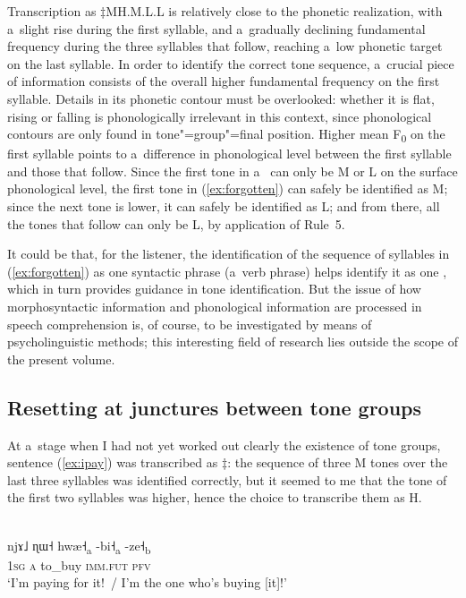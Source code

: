 Transcription as $\ddagger${\kern2pt}MH.M.L.L is relatively close to the
phonetic realization, with a~slight rise during the first syllable, and a~gradually declining
fundamental frequency during the three syllables that follow, reaching a~low phonetic target on
the last syllable. In order to identify the correct tone sequence, a~crucial piece of information
consists of the overall higher fundamental frequency on the first syllable. Details in its phonetic
{contour} must be overlooked: whether it is flat, rising or falling is phonologically irrelevant in
this context, since phonological contours are only found in tone"=group"=final position. Higher mean F\textsubscript{0} on the first syllable points to a~difference in phonological level between the first syllable and those that
follow. Since the first tone in a~ can only be M or L on the surface phonological level,
the first tone in (\ref{ex:forgotten}) can safely be identified as M; since the next tone is lower, it can safely be identified as L; and from there, all the tones that follow can only be L, by application of Rule~5. 

It could be that, for the listener, the identification of the sequence of syllables in (\ref{ex:forgotten}) as one syntactic phrase (a~verb phrase) helps identify it as one , which in turn provides guidance in tone identification. But the issue of how morphosyntactic information and phonological information are processed in speech comprehension is, of course, to be investigated by means of psycholinguistic methods; this interesting field of research lies outside the scope of the present volume.


\subsection{Resetting at junctures between tone groups}
\label{sec:resettingatjuncturesbetweentonegroups}

At a~stage when I had not yet worked out clearly the existence of tone groups, sentence (\ref{ex:ipay}) was
transcribed as $\ddagger${\kern2pt}: the sequence of three M tones over the last three
syllables was identified correctly, but it seemed to me that the tone of the first two syllables was higher, hence the choice to transcribe them as H. 

\begin{exe}
	\ex
	\label{ex:ipay}
	\\ 
	\gll njɤ˩	ɳɯ˧	hwæ˧\textsubscript{a}	-bi˧\textsubscript{a}	-ze˧\textsubscript{b}\\
	\textsc{1sg}		\textsc{a}		to\_buy		\textsc{imm.fut}		\textsc{pfv}\\
	\glt ‘I’m paying for it!~/ I’m the one who’s buying [it]!’
\end{exe}

